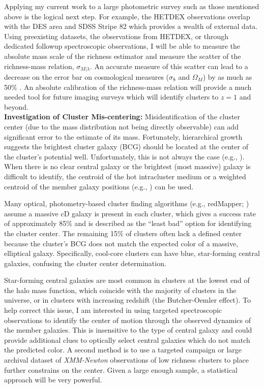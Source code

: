 \documentclass[overlapped, line, 11pt]{res}
\newcommand{\eg}{e.g.}
\newcommand{\citeeg}[1]{(\eg, \citealt{#1})}
\begin{document}
\begin{resume}
Applying my current work to a large photometric survey such as those mentioned above is the logical next step. For example, the HETDEX observations overlap with the DES area and SDSS Stripe 82 which provides a wealth of external data. Using preexisting datasets, the observations from HETDEX, or through dedicated followup spectroscopic observations, I will be able to measure the absolute mass scale of the richness estimator and measure the scatter of the richness-mass relation, $\sigma_{M|\lambda}$. An accurate measure of this scatter can lead to a decrease on the error bar on cosmological measures ($\sigma_8$ and $\Omega_M$) by as much as 50\% \citep{Rozo2010}. An absolute calibration of the richness-mass relation will provide a much needed tool for future imaging surveys which will identify clusters to $z=1$ and beyond.\\

\noindent \textbf{Investigation of Cluster Mis-centering:} Misidentification of the cluster center (due to the mass distribution not being directly observable) can add significant error to the estimate of its mass. Fortunately, hierarchical growth suggests the brightest cluster galaxy (BCG) should be located at the center of the cluster's potential well. Unfortunately, this is not always the case \citeeg{Skibba2011}. When there is no clear central galaxy or the brightest (most massive) galaxy is difficult to identify, the centroid of the hot intracluster medium or a weighted centroid of the member galaxy positions \citeeg{George2012} can be used.

Many optical, photometry-based cluster finding algorithms (\eg, redMapper; \citealt{Rykoff2014}) assume a massive cD galaxy is present in each cluster, which gives a success rate of approximately 85\% and is described as the ``least bad'' option for identifying the cluster center. The remaining 15\% of clusters often lack a defined center because the cluster's BCG does not match the expected color of a massive, elliptical galaxy. Specifically, cool-core clusters can have blue, star-forming central galaxies, confusing the cluster center determination.

Star-forming central galaxies are most common in clusters at the lowest end of the halo mass function, which coincide with the majority of clusters in the universe, or in clusters with increasing redshift (the Butcher-Oemler effect). To help correct this issue, I am interested in using targeted spectroscopic observations to identify the center of motion through the observed dynamics of the member galaxies. This is insensitive to the type of central galaxy and could provide additional clues to  optically select central galaxies which do not match the predicted color. A second method is to use a targeted campaign or large archival dataset of \emph{XMM-Newton} observations of low richness clusters to place further constrains on the center. Given a large enough sample, a statistical approach will be very powerful.\\


\end{resume}
\end{document}
